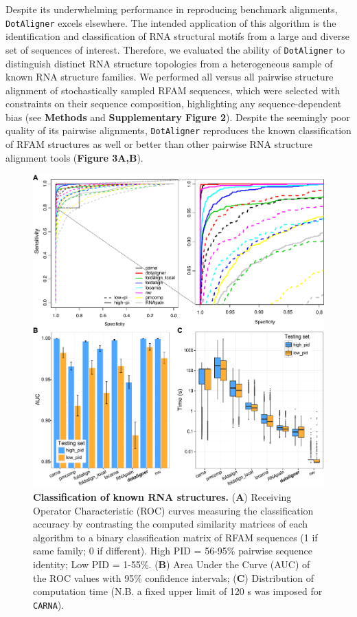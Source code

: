 \documentclass[a4paper,11pt]{article}
\newcommand\dotaligner{\texttt{DotAligner}}
\newcommand\carna{\texttt{CARNA}}
\begin{document}
Despite its underwhelming performance in reproducing benchmark alignments, \dotaligner{} 
excels elsewhere. The intended application of this algorithm is the identification and
classification of RNA structural motifs from a large and diverse set of sequences of interest. 
Therefore, we evaluated the ability of \dotaligner{} to distinguish distinct RNA structure
 topologies from a heterogeneous sample of known 
 RNA structure families. We performed all versus all 
pairwise structure alignment of stochastically sampled RFAM sequences, which 
were selected with constraints on their sequence composition,  highlighting any 
sequence-dependent bias (see \textbf{Methods} and \textbf{Supplementary Figure 2}). Despite the seemingly
poor quality of its pairwise alignments, \dotaligner{} reproduces the known classification 
of RFAM structures as well or better than other pairwise RNA structure alignment tools
(\textbf{Figure 3A,B}). \\

\begin{figure}
 \includegraphics[width=\textwidth]{fig2}
 \caption { \textbf{Classification of known RNA structures. }
 (\textbf{A}) Receiving Operator Characteristic (ROC) curves measuring the classification
 accuracy by contrasting the computed similarity matrices of each algorithm 
 to a binary classification matrix of RFAM  sequences (1 if same family; 
 0 if different). High PID =  56-95\% pairwise sequence identity; Low PID  = 1-55\%.
 (\textbf{B}) Area Under the Curve (AUC) of the ROC values with 95\% confidence intervals; 
 (\textbf{C}) Distribution of computation time (N.B. a fixed upper limit of 120 s was 
 imposed for \carna{}). 
 }
\end{figure}
\end{document}
